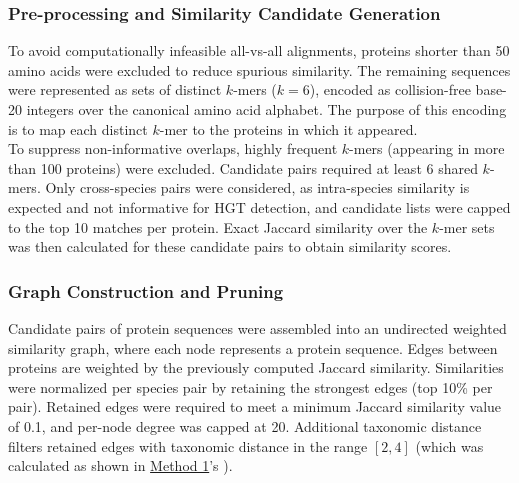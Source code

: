 \documentclass[11pt]{article}
\begin{document}
	\subsubsection{Pre-processing and Similarity Candidate Generation}
	To avoid computationally infeasible all-vs-all alignments, proteins shorter than 50 amino acids were excluded to reduce spurious similarity. The remaining sequences were represented as sets of distinct $k$-mers ($k=6$), encoded as collision-free base-20 integers over the canonical amino acid alphabet\cite{Sims2009,Haubold2014}. The purpose of this encoding is to map each distinct $k$-mer to the proteins in which it appeared.\\
	To suppress non-informative overlaps, highly frequent $k$-mers (appearing in more than 100 proteins) were excluded. Candidate pairs required at least 6 shared $k$-mers. Only cross-species pairs were considered, as intra-species similarity is expected and not informative for HGT detection, and candidate lists were capped to the top 10 matches per protein. Exact Jaccard similarity over the $k$-mer sets was then calculated for these candidate pairs to obtain similarity scores. 
	
	\subsubsection{Graph Construction and Pruning}
	Candidate pairs of protein sequences were assembled into an undirected weighted similarity graph, where each node represents a protein sequence. Edges between proteins are weighted by the previously computed Jaccard similarity. Similarities were normalized per species pair by retaining the strongest edges (top 10\% per pair). Retained edges were required to meet a minimum Jaccard similarity value of 0.1, and per-node degree was capped at 20. Additional taxonomic distance filters retained edges with taxonomic distance in the range $[2,4]$ (which was calculated as shown in \hyperref[subsec:method1]{Method 1}'s ).
	
\end{document}
